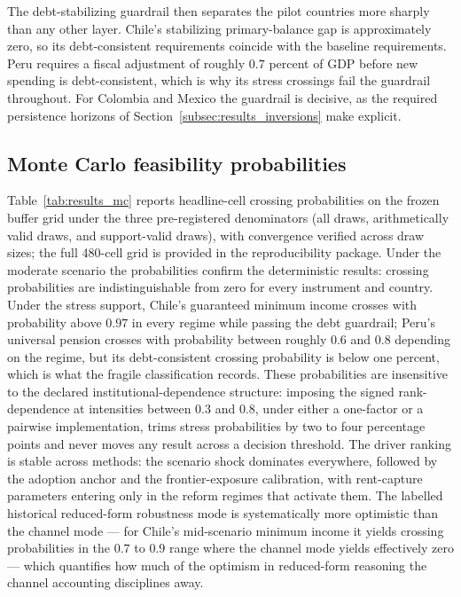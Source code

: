 \documentclass[11pt,a4paper]{article}
\begin{document}
The debt-stabilizing guardrail then separates the pilot countries more sharply than any
other layer. Chile's stabilizing primary-balance gap is approximately zero, so its
debt-consistent requirements coincide with the baseline requirements. Peru requires a fiscal
adjustment of roughly $0.7$ percent of GDP before new spending is debt-consistent, which is
why its stress crossings fail the guardrail throughout. For Colombia and Mexico the
guardrail is decisive, as the required persistence horizons of
Section~\ref{subsec:results_inversions} make explicit.



\subsection{Monte Carlo feasibility probabilities}\label{subsec:results_mc}

Table~\ref{tab:results_mc} reports headline-cell crossing probabilities on the frozen buffer
grid under the three pre-registered denominators (all draws, arithmetically valid draws, and
support-valid draws), with convergence verified across draw sizes; the full 480-cell grid is
provided in the reproducibility package.
Under the moderate scenario the probabilities confirm the deterministic results: crossing
probabilities are indistinguishable from zero for every instrument
and country. Under the stress support, Chile's guaranteed minimum income crosses with
probability above $0.97$ in every regime while passing the debt guardrail; Peru's universal
pension crosses with probability between roughly $0.6$ and $0.8$ depending on the regime,
but its debt-consistent crossing probability is below one percent, which is what the
fragile classification records. These probabilities are insensitive to the declared institutional-dependence structure:
imposing the signed rank-dependence at intensities between $0.3$ and $0.8$, under either a
one-factor or a pairwise implementation, trims stress probabilities by two to four
percentage points and never moves any result across a decision threshold. The
driver ranking is stable across methods: the scenario shock dominates everywhere, followed
by the adoption anchor and the frontier-exposure calibration, with rent-capture parameters
entering only in the reform regimes that activate them. The labelled historical
reduced-form robustness mode is systematically more optimistic than the channel mode ---
for Chile's mid-scenario minimum income it yields crossing probabilities in the $0.7$ to
$0.9$ range where the channel mode yields effectively zero --- which quantifies how much of
the optimism in reduced-form reasoning the channel accounting disciplines away.
\end{document}
